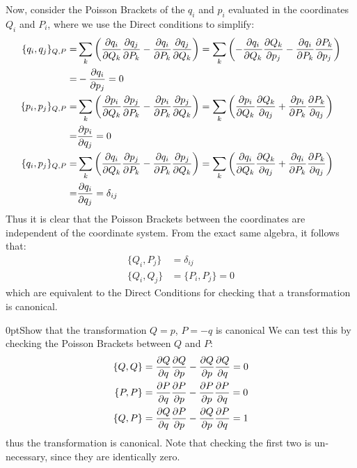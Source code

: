 Now, consider the Poisson Brackets of the $q_i$ and $p_i$ evaluated in the coordinates $Q_i$ and $P_i$, where we use the Direct conditions to simplify:
\begin{align}
\{q_i,q_j\}_{Q,P}=&\sum_k\left(\frac{\partial q_i}{\partial Q_k}\frac{\partial q_j}{\partial P_k}-\frac{\partial q_i}{\partial P_k}\frac{\partial q_j}{\partial Q_k}\right)=\sum_k\left(-\frac{\partial q_i}{\partial Q_k}\frac{\partial Q_k}{\partial p_j}-\frac{\partial q_i}{\partial P_k}\frac{\partial P_k}{\partial p_j}\right)\nonumber\\
=&-\frac{\partial q_i}{\partial p_j}=0\nonumber\\
\{p_i,p_j\}_{Q,P}=&\sum_k\left(\frac{\partial p_i}{\partial Q_k}\frac{\partial p_j}{\partial P_k}-\frac{\partial p_i}{\partial P_k}\frac{\partial p_j}{\partial Q_k}\right) =\sum_k\left(\frac{\partial p_i}{\partial Q_k}\frac{\partial Q_k}{\partial q_j}+\frac{\partial p_i}{\partial P_k}\frac{\partial P_k}{\partial q_j}\right)\nonumber\\
=&\frac{\partial p_i}{\partial q_j}=0\nonumber\\
\{q_i,p_j\}_{Q,P}=&\sum_k\left(\frac{\partial q_i}{\partial Q_k}\frac{\partial p_j}{\partial P_k}-\frac{\partial q_i}{\partial P_k}\frac{\partial p_j}{\partial Q_k}\right)
=\sum_k\left(\frac{\partial q_i}{\partial Q_k}\frac{\partial Q_k}{\partial q_j}+\frac{\partial q_i}{\partial P_k}\frac{\partial P_k}{\partial q_j}\right)\nonumber\\
=&\frac{\partial q_i}{\partial q_j}=\delta_{ij}
\end{align}
Thus it is clear that the Poisson Brackets between the coordinates are independent of the coordinate system. From the exact same algebra, it follows that:
\begin{align}
\{Q_i,P_j\}&=\delta_{ij}\nonumber\\
\{Q_i,Q_j\}&=\{P_i,P_j\}=0
\end{align}
which are equivalent to the Direct Conditions for checking that a transformation is canonical.
\begin{example}{0pt}{Show that the transformation $Q=p$, $P=-q$ is canonical}{}
We can test this by checking the Poisson Brackets between $Q$ and $P$:
\begin{align*}
\{Q,Q\}&=\frac{\partial Q}{\partial q}\frac{\partial Q}{\partial p}-\frac{\partial Q}{\partial p}\frac{\partial Q}{\partial q}=0\nonumber\\
\{P,P\}&=\frac{\partial P}{\partial q}\frac{\partial P}{\partial p}-\frac{\partial P}{\partial p}\frac{\partial P}{\partial q}=0\nonumber\\
\{Q,P\}&=\frac{\partial Q}{\partial q}\frac{\partial P}{\partial p}-\frac{\partial Q}{\partial p}\frac{\partial P}{\partial q}=1
\end{align*}
thus the transformation is canonical. Note that checking the first two is un-necessary, since they are identically zero.
\end{example}

